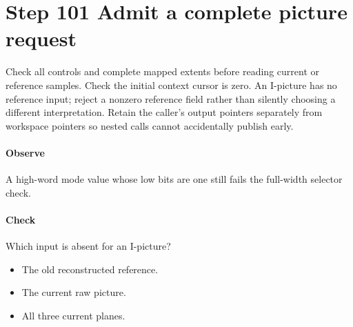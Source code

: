 \section{Step 101 Admit a complete picture request}\label{h263-picture-s01}
Check all controls and complete mapped extents before reading current or reference
samples. Check the initial context cursor is zero. An I-picture has no reference
input; reject a nonzero reference field rather than silently choosing a different
interpretation. Retain the caller's output pointers separately from workspace
pointers so nested calls cannot accidentally publish early.

\paragraph{Observe} A high-word mode value whose low bits are one still fails the full-width selector check.
\paragraph{Check} Which input is absent for an I-picture?
\begin{itemize}
  \item[A.] The old reconstructed reference.
  \item[B.] The current raw picture.
  \item[C.] All three current planes.
\end{itemize}
